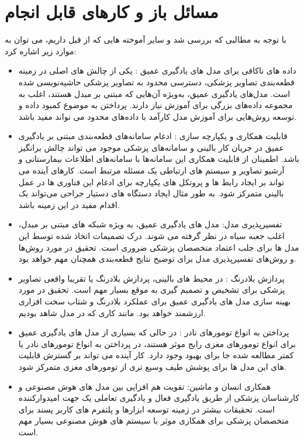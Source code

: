 \section{مسائل باز و کارهای قابل انجام}
با توجه به مطالبی که بررسی شد و سایر آموخته هایی که از قبل داریم، می توان به موارد زیر اشاره کرد:
\begin{itemize}
    \item داده های ناکافی برای مدل های یادگیری عمیق : یکی از چالش های اصلی در زمینه قطعه‌بندی تصاویر پزشکی، دسترسی محدود به تصاویر پزشکی حاشیه‌نویسی شده است. مدل‌های یادگیری عمیق، به‌ویژه آن‌هایی که مبتنی بر مبدل هستند، اغلب به مجموعه داده‌های بزرگی برای آموزش نیاز دارند. پرداختن به موضوع کمبود داده و توسعه روش‌هایی برای آموزش مدل کارآمد با داده‌های محدود می تواند مفید باشد.
    \item قابلیت همکاری و یکپارچه سازی : ادغام سامانه‌های قطعه‌بندی مبتنی بر یادگیری عمیق در جریان کار بالینی و سامانه‌های پزشکی موجود می تواند چالش برانگیز باشد. اطمینان از قابلیت همکاری این سامانه‌ها با سامانه‌های اطلاعات بیمارستانی و آرشیو تصاویر و سیستم های ارتباطی یک مسئله مرتبط است. کارهای آینده می تواند بر ایجاد رابط ها و پروتکل های یکپارچه برای ادغام این فناوری ها در عمل بالینی متمرکز شود. به طور مثال ایجاد دستگاه های دستیار جراحی می‌تواند یک اقدام مفید در این زمینه باشد.
    \item تفسیرپذیری مدل: مدل های یادگیری عمیق، به ویژه شبکه های مبتنی بر مبدل، اغلب جعبه سیاه در نظر گرفته می شوند. درک تصمیمات اتخاذ شده توسط این مدل ها برای جلب اعتماد متخصصان پزشکی ضروری است. تحقیق در مورد روش‌ها و روش‌های تفسیرپذیری مدل برای توضیح نتایج قطعه‌بندی همچنان مهم خواهد بود.
    \item پردازش بلادرنگ : در محیط های بالینی، پردازش بلادرنگ یا تقریبا واقعی تصاویر پزشکی برای تشخیص و تصمیم گیری به موقع بسیار مهم است. تحقیق در مورد بهینه سازی مدل های یادگیری عمیق برای عملکرد بلادرنگ و شتاب سخت افزاری ارزشمند خواهد بود. مانند کاری که در مدل  شاهد بودیم.
    \item پرداختن به انواع تومورهای نادر : در حالی که بسیاری از مدل های یادگیری عمیق برای انواع تومورهای مغزی رایج موثر هستند، در پرداختن به انواع تومورهای نادر یا کمتر مطالعه شده جا برای بهبود وجود دارد. کار آینده می تواند بر گسترش قابلیت های این مدل ها برای پوشش طیف وسیع تری از تومورهای مغزی متمرکز شود.
    \item همکاری انسان و ماشین: تقویت هم افزایی بین مدل های هوش مصنوعی و کارشناسان پزشکی از طریق یادگیری فعال و یادگیری تعاملی یک جهت امیدوارکننده است. تحقیقات بیشتر در زمینه توسعه ابزارها و پلتفرم های کاربر پسند برای متخصصان پزشکی برای همکاری موثر با سیستم های هوش مصنوعی بسیار مهم است.

\end{itemize}
